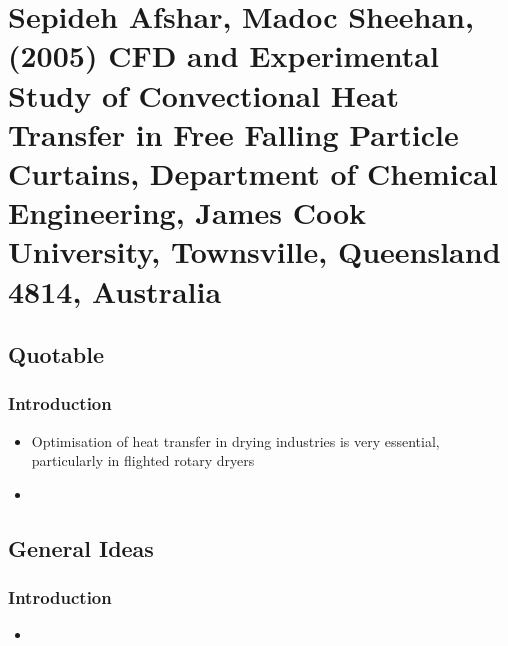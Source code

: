 \documentclass[12pt]{article}
\begin{document}
\section{Sepideh Afshar, Madoc Sheehan, (2005) CFD and Experimental Study of Convectional Heat Transfer in Free Falling Particle Curtains, Department of Chemical Engineering, James Cook University, Townsville, Queensland 4814, Australia}

\subsection{Quotable}

\subsubsection{Introduction}
\begin{itemize}
	\item Optimisation of heat transfer in drying industries is very essential, particularly in flighted rotary dryers
	\item 
\end{itemize}

\subsection{General Ideas}

\subsubsection{Introduction}
\begin{itemize}
	\item 
\end{itemize}
\end{document}
